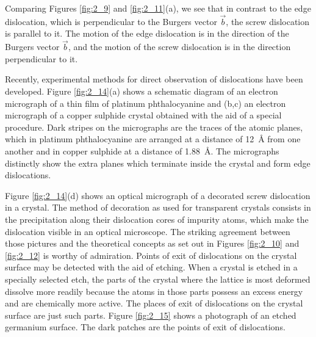 Comparing Figures \ref{fig:2_9} and \ref{fig:2_11}(a), we see that in contrast to the edge dislocation, which is perpendicular to the Burgers vector $\vec{b}$, the screw dislocation is parallel to it. The motion of the edge dislocation is in the direction of the Burgers vector $\vec{b}$, and the motion of the screw dislocation is in the direction perpendicular to it.

Recently, experimental methods for direct observation of dislocations have been developed. Figure \ref{fig:2_14}(a) shows a schematic diagram of an electron micrograph of a thin film of platinum phthalocyanine and (b,c) an electron micrograph of a copper sulphide crystal obtained with the aid of a special procedure. Dark stripes on the micrographs are the traces of the atomic planes, which in platinum phthalocyanine are arranged at a distance of \SI{12}{\angstrom} from one another and in copper sulphide at a distance of \SI{1.88}{\angstrom}. The
micrographs distinctly show the extra planes which terminate inside the crystal and form edge dislocations.

Figure \ref{fig:2_14}(d) shows an optical micrograph of a decorated screw dislocation in a  crystal. The method of decoration as used for transparent crystals consists in the precipitation along their dislocation cores of impurity atoms, which make the dislocation visible in an optical microscope. The striking agreement between those pictures and the theoretical concepts as set out in Figures \ref{fig:2_10} and \ref{fig:2_12} is worthy of admiration. Points of exit of dislocations on the crystal surface may be detected with the aid of etching. When a crystal is etched in a specially selected etch, the parts of the crystal where the lattice is most deformed dissolve more readily because the atoms in those parts possess an excess energy and are chemically more active. The places of exit of dislocations on the crystal surface are just such parts. Figure \ref{fig:2_15} shows a photograph of an etched germanium surface. The dark patches are the points of exit of dislocations.

